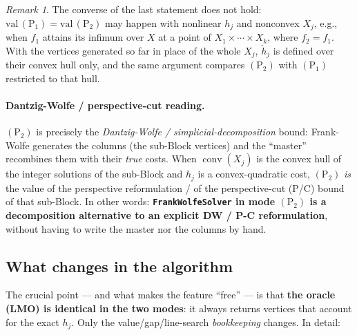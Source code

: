 \documentclass[11pt,a4paper]{article}
\newcommand{\conv}{\operatorname{conv}}
\newcommand{\code}[1]{\texttt{#1}}
\newcommand{\Pone}{(\mathrm{P}_1)}
\newcommand{\Ptwo}{(\mathrm{P}_2)}
\theoremstyle{plain}
\theoremstyle{remark}
\newtheorem*{remark}{Remark}
\begin{document}
\begin{remark}
The converse of the last statement does not hold: $\mathrm{val}\,\Pone=
\mathrm{val}\,\Ptwo$ may happen with nonlinear $h_j$ and nonconvex $X_j$, e.g.,
when $f_1$ attains its infimum over $X$ at a point of $X_1\times\cdots\times
X_k$, where $f_2=f_1$. With the vertices
generated so far in place of the whole $X_j$, $\check h_j$ is defined over their
convex hull only, and the same argument compares $\Ptwo$ with $\Pone$ restricted
to that hull.
\end{remark}

\paragraph{Dantzig-Wolfe / perspective-cut reading.}
$\Ptwo$ is precisely the \emph{Dantzig-Wolfe / simplicial-decomposition} bound:
Frank-Wolfe generates the columns (the sub-Block vertices) and the ``master''
recombines them with their \emph{true} costs. When $\conv(X_j)$ is the convex hull
of the integer solutions of the sub-Block and $h_j$ is a convex-quadratic cost,
$\Ptwo$ \emph{is} the value of the perspective reformulation / of the
perspective-cut (P/C) bound of that sub-Block. In other words:
\textbf{\code{FrankWolfeSolver} in mode $\Ptwo$ is a decomposition alternative to
an explicit DW / P-C reformulation}, without having to write the master nor the
columns by hand.

\subsection{What changes in the algorithm}\label{sec:whatchanges}

The crucial point --- and what makes the feature ``free'' --- is that
\textbf{the oracle (LMO) is identical in the two modes}: it always returns
vertices that account for the exact $h_j$. Only the value/gap/line-search
\emph{bookkeeping} changes. In detail:
\end{document}
